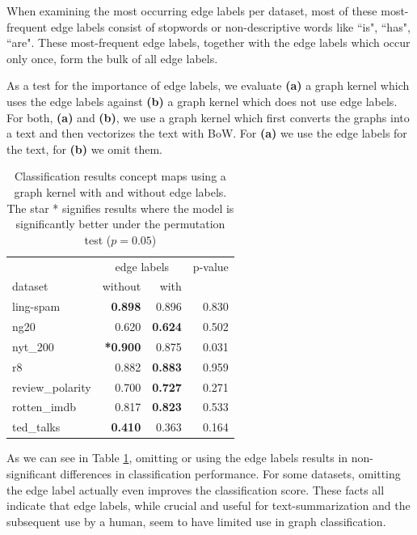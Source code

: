 When examining the most occurring edge labels per dataset, most of these most-frequent edge labels consist of stopwords or non-descriptive words like ``is", ``has", ``are".
These most-frequent edge labels, together with the edge labels which occur only once, form the bulk of all edge labels.

As a test for the importance of edge labels, we evaluate \textbf{(a)} a graph kernel which uses the edge labels against \textbf{(b)} a graph kernel which does not use edge labels.
For both, \textbf{(a)} and \textbf{(b)}, we use a graph kernel which first converts the graphs into a text and then vectorizes the text with BoW.
For \textbf{(a)} we use the edge labels for the text, for \textbf{(b)} we omit them.

\begin{table}[htb!]
	\centering
\begin{tabular}{lrrr}
	{} & \multicolumn{2}{c}{edge labels}  & p-value \\
	dataset & without & with \\
	\midrule
		ling-spam       & \textbf{0.898} & 0.896 & 0.830 \\
		ng20            & 0.620 & \textbf{0.624} & 0.502 \\
		nyt\_200         & \textbf{*0.900} & 0.875 & 0.031 \\
		r8              & 0.882 & \textbf{0.883} & 0.959 \\
		review\_polarity & 0.700 & \textbf{0.727} & 0.271 \\
		rotten\_imdb     & 0.817 & \textbf{0.823} & 0.533 \\
		ted\_talks       & \textbf{0.410} & 0.363 & 0.164 \\
	\bottomrule
\end{tabular}
\caption[Results: Graph Kernel with and without edge labels]{Classification results concept maps using a graph kernel with and without edge labels.  The star * signifies results where the model is significantly better under the permutation test ($p = 0.05$)}\label{table:edge_label_classification}
\end{table}

As we can see in Table \ref{table:edge_label_classification}, omitting or using the edge labels results in non-significant differences in classification performance.
For some datasets, omitting the edge label actually even improves the classification score.
These facts all indicate that edge labels, while crucial and useful for text-summarization and the subsequent use by a human, seem to have limited use in graph classification.

